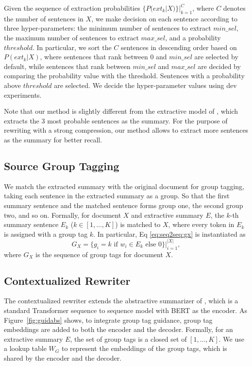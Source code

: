 \documentclass[letterpaper]{article} %
\begin{document}
Given the sequence of extraction probabilities $\{P(ext_k|X)\}|^{C}_{k=1}$, where $C$ denotes the number of sentences in $X$, we make decision on each sentence according to three hyper-parameters: the minimum number of sentences to extract $min\_sel$, the maximum number of sentences to extract $max\_sel$, and a probability $threshold$. In particular, we sort the $C$ sentences in descending order based on $P(ext_k|X)$, where sentences that rank between $0$ and $min\_sel$ are selected by default, while sentences that rank between $min\_sel$ and $max\_sel$ are decided by comparing the probability value with the threshold. Sentences with a probability above $threshold$ are selected. We decide the hyper-parameter values using dev experiments.

Note that our method is slightly different from the extractive model of \citet{Liu2019}, which extracts the 3 most probable sentences as the summary. For the purpose of rewriting with a strong compression, our method allows to extract more sentences as the summary for better recall.


\subsection{Source Group Tagging}
\label{method:grouptag}
We match the extracted summary with the original document for group tagging, taking each sentence in the extracted summary as a group. So that the first summary sentence and the matched sentence forms group one, the second group two, and so on.
Formally, for document $X$ and extractive summary $E$, the $k$-th summary sentence $E_k$ ($k \in [1,...,K]$) is matched to $X$, where every token in $E_k$ is assigned with a group tag $k$. In particular, Eq \ref{eq:seq2seq:gx} is instantiated as
\begin{equation}
    G_X = \{g_i = k \text{ if } w_i \in E_k \text{ else } 0\}|^{|X|}_{i=1},
\label{eq:grouptag:gx}
\end{equation}
where $G_X$ is the sequence of group tags for document $X$.

\subsection{Contextualized Rewriter}
\label{method:abs}
The contextualized rewriter extends the abstractive summarizer of \citet{Liu2019}, which is a standard Transformer sequence to sequence model with BERT as the encoder. As Figure~\ref{fig:guidabs} shows, to integrate group tag guidance, group tag embeddings are added to both the encoder and the decoder. 
Formally, for an extractive summary $E$, the set of group tags is a closed set of $[1,...,K]$. We use a lookup table $W_G$ to represent the embeddings of the group tags, which is shared by the encoder and the decoder.
\end{document}
